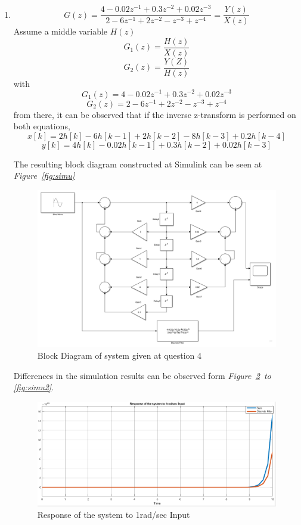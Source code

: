\documentclass[a4paper,12pt]{article}
\begin{document}
\begin{enumerate}
\begin{enumerate}
		
		\end{enumerate}
	\item $$	G(z)=\frac{4-0.02z^{-1}+0.3z^{-2}+0.02z^{-3}}{2-6z^{-1}+2z^{-2}-z^{-3}+z^{-4}}=\frac{Y(z)}{X(z)}	$$
		Assume a middle variable $H(z)$	
		$$ G_1(z)=\frac{H(z)}{X(z)}$$
		$$ G_2(z)=\frac{Y(Z)}{H(z)} $$
		with
		$$ G_1(z)=4-0.02z^{-1}+0.3z^{-2}+0.02z^{-3} $$
		$$ G_2(z)= 2-6z^{-1}+2z^{-2}-z^{-3}+z^{-4} $$
		from there, it can be observed that if the inverse z-transform is performed on both equations,
		$$\boxed{	x[k]=2h[k]-6h[k-1]+2h[k-2]-8h[k-3]+0.2h[k-4] }$$
		$$\boxed{	y[k]=4h[k]-0.02h[k-1]+0.3h[k-2]+0.02h[k-3] }$$
		
		The resulting block diagram constructed at Simulink can be seen at \textit{Figure~\ref{fig:simu}}
		\begin{figure}[H]
			\center
			\setlength{\unitlength}{\textwidth} 
			\includegraphics[width=1.0\unitlength]{model3}
			\caption{\label{fig:simmu} Block Diagram of system given at question 4  }
		\end{figure}
				
			
		Differences in the simulation results can be observed form \textit{Figure~\ref{fig:simu1}\ to \ref{fig:simu2}}.
	\begin{figure}[H]
			\center
			\setlength{\unitlength}{\textwidth} 
  		\includegraphics[width=1.0\unitlength]{415}
  		\caption{\label{fig:simu1}Response of the system to 1rad/sec Input }
  	\end{figure}
	

\end{enumerate}
\end{document}
